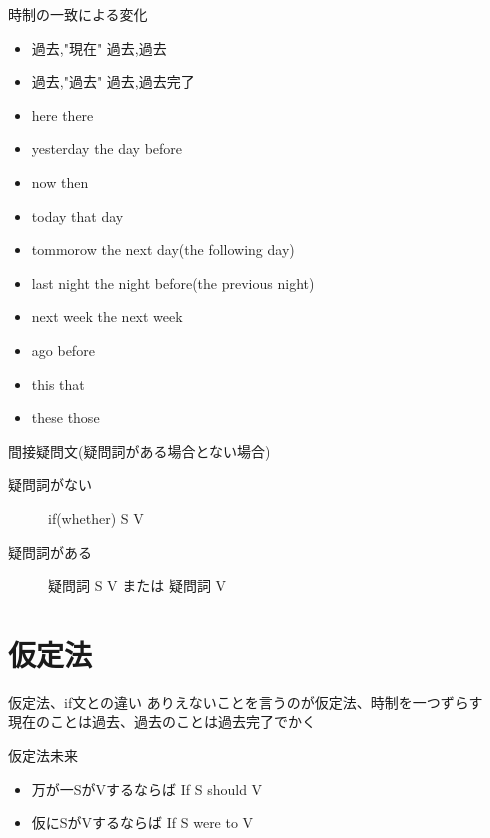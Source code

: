 \documentclass[10pt]{jsarticle}
\newcommand{\answer}[2]{{\color{orange}#2}}
\newcommand{\answer}[2]{\vspace{#1mm}}
\begin{document}
\begin{itembox}[l]{時制の一致による変化}
	\begin{multicols}{2}
		\begin{itemize}
			\item 過去,"現在" \answer{5}{過去,過去}
			\item 過去,"過去" \answer{5}{過去,過去完了}
			\item here \answer{5}{there}
			\item yesterday \answer{5}{the day before}
			\item now \answer{5}{then}
			\item today \answer{5}{that day}
			\item tommorow \answer{5}{the next day(the following day)}
			\item last night \answer{5}{the night before(the previous night)}
			\item next week \answer{5}{the next week}
			\item ago \answer{5}{before}
			\item this \answer{5}{that}
			\item these \answer{5}{those}
		\end{itemize}
	\end{multicols}
\end{itembox}


\begin{itembox}[l]{間接疑問文(疑問詞がある場合とない場合)}
	\begin{description}
		\item[疑問詞がない] \answer{5}{if(whether) S V}
		\item[疑問詞がある] \answer{5}{疑問詞 S V または 疑問詞 V}
	\end{description}
\end{itembox}

\newpage

\section{仮定法}
\begin{itembox}[l]{仮定法、if文との違い}
	\answer{10}{ありえないことを言うのが仮定法、時制を一つずらす\\
		現在のことは過去、過去のことは過去完了でかく}
\end{itembox}

\begin{itembox}[l]{仮定法未来}
	\begin{itemize}
		\item 万が一SがVするならば \answer{5}{If S should V}
		\item 仮にSがVするならば \answer{5}{If S were to V}
	\end{itemize}
\end{itembox}
\end{document}
